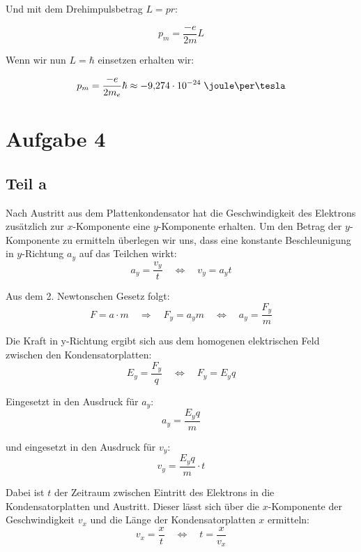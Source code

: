 \documentclass[a4paper,german,12pt,smallheadings]{scrartcl}
\begin{document}
Und mit dem Drehimpulsbetrag $L = pr$:

\begin{equation*}
  p_m = \frac{-e}{2m} L
\end{equation*}

Wenn wir nun $L = \hbar$ einsetzen erhalten wir:

\begin{equation*}
  p_m = \frac{-e}{2m_e} \hbar \approx -9{,}274 \cdot 10^{-24} \;\joule\per\tesla
\end{equation*}

\section*{Aufgabe 4}
\subsection*{Teil a}

Nach Austritt aus dem Plattenkondensator hat die Geschwindigkeit des Elektrons
zusätzlich zur $x$-Komponente eine $y$-Komponente erhalten. Um den Betrag der
$y$-Komponente zu ermitteln überlegen wir uns, dass eine konstante Beschleunigung
in $y$-Richtung $a_y$ auf das Teilchen wirkt:
\begin{equation*}
a_y=\frac{v_y}{t} \quad \Leftrightarrow \quad v_y=a_yt
\end{equation*}

Aus dem 2. Newtonschen Gesetz folgt:
\begin{equation*}
F=a \cdot m \quad \Rightarrow \quad F_y=a_ym \quad \Leftrightarrow \quad a_y=\frac{F_y}{m}
\end{equation*}

Die Kraft in y-Richtung ergibt sich aus dem homogenen elektrischen Feld zwischen den Kondensatorplatten:
\begin{equation*}
E_y=\frac{F_y}{q} \quad \Leftrightarrow \quad F_y=E_yq
\end{equation*}

Eingesetzt in den Ausdruck für $a_y$:
\begin{equation*}
a_y=\frac{E_yq}{m}
\end{equation*}

und eingesetzt in den Ausdruck für $v_y$:
\begin{equation*}
v_y=\frac{E_yq}{m} \cdot t
\end{equation*}

Dabei ist $t$ der Zeitraum zwischen Eintritt des Elektrons in die
Kondensatorplatten und Austritt.  Dieser lässt sich über die $x$-Komponente der
Geschwindigkeit $v_x$ und die Länge der Kondensatorplatten $x$ ermitteln:
\begin{equation*}
v_x=\frac{x}{t} \quad \Leftrightarrow \quad t=\frac{x}{v_x}
\end{equation*}
\end{document}
